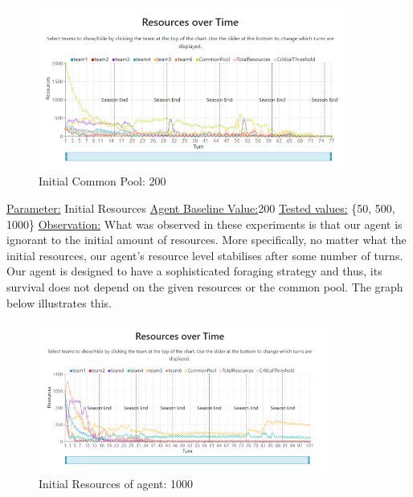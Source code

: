 \begin{figure}[!htb]
    \centering
    \includegraphics[width=0.9\textwidth]{13_team5_agentdesign/images/InitCP2000.PNG}
    \caption{Initial Common Pool: 200}
    \label{Initial Common Pool: 200}
\end{figure}

\newpage
\underline{Parameter:} Initial Resources \newline
\underline{Agent Baseline Value:}200 \newline
\underline{Tested values:} \{50, 500, 1000\} \newline
\underline{Observation:} \newline
What was observed in these experiments is that our agent is ignorant to the initial amount of resources. More specifically, no matter what the initial resources, our agent's resource level stabilises after some number of turns. Our agent is designed to have a sophisticated foraging strategy and thus, its survival does not depend on the given resources or the common pool. The graph below illustrates this.

\begin{figure}[!htb]
    \centering
    \includegraphics[width=0.85\textwidth]{13_team5_agentdesign/images/InitRes.PNG}
    \caption{Initial Resources of agent: 1000}
\end{figure}


